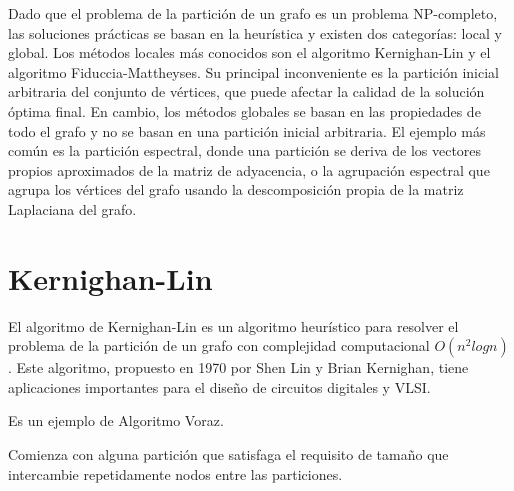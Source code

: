 Dado que el problema de la partición de un grafo es un problema NP-completo, las soluciones prácticas se basan en la heurística y existen dos categorías: local y global. Los métodos locales más conocidos son el algoritmo Kernighan-Lin\cite{KernighanLin} y el algoritmo Fiduccia-Mattheyses\cite{FiducciaMattheyses}. Su principal inconveniente es la partición inicial arbitraria del conjunto de vértices, que puede afectar la calidad de la solución óptima final. En cambio, los métodos globales se basan en las propiedades de todo el grafo y no se basan en una partición inicial arbitraria. El ejemplo más común es la partición espectral, donde una partición se deriva de los vectores propios aproximados de la matriz de adyacencia, o la agrupación espectral que agrupa los vértices del grafo usando la descomposición propia de la matriz Laplaciana del grafo.

\section{Kernighan-Lin}
El algoritmo de Kernighan-Lin\cite{KernighanLin} es un algoritmo heurístico para resolver el problema de la partición de un grafo con complejidad computacional $O({n}^2logn)$. Este algoritmo, propuesto en 1970 por Shen Lin y Brian Kernighan, tiene aplicaciones importantes para el diseño de circuitos digitales y VLSI. 

Es un ejemplo de Algoritmo Voraz.

Comienza con alguna partición que satisfaga el requisito de tamaño que intercambie repetidamente nodos entre las particiones.